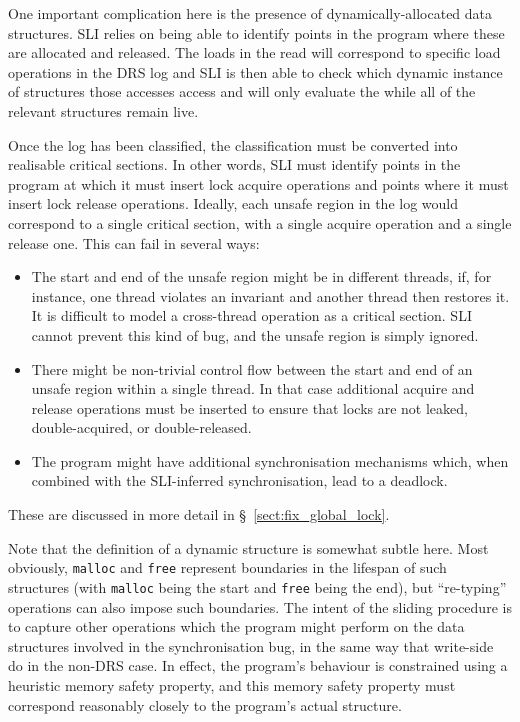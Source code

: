 One important complication here is the presence of dynamically-allocated data structures.
SLI relies on being able to identify points in the program where these are allocated and released.
The loads in the read \StateMachine will correspond to specific load operations in the DRS log and SLI is then able to check which dynamic instance of structures those accesses access and will only evaluate the \StateMachine while all of the relevant structures remain live.

Once the log has been classified, the classification must be converted into realisable critical sections.
In other words, SLI must identify points in the program at which it must insert lock acquire operations and points where it must insert lock release operations.
Ideally, each unsafe region in the log would correspond to a single critical section, with a single acquire operation and a single release one.
This can fail in several ways:

\begin{itemize}
\item
  The start and end of the unsafe region might be in different threads, if, for instance, one thread violates an invariant and another thread then restores it.
  It is difficult to model a cross-thread operation as a critical section.
  SLI cannot prevent this kind of bug, and the unsafe region is simply ignored.
\item
  There might be non-trivial control flow between the start and end of an unsafe region within a single thread.
  In that case additional acquire and release operations must be inserted to ensure that locks are not leaked, double-acquired, or double-released.
\item
  The program might have additional synchronisation mechanisms which, when combined with the SLI-inferred synchronisation, lead to a deadlock.
\end{itemize}

These are discussed in more detail in \S~\ref{sect:fix_global_lock}.


Note that the definition of a dynamic structure is somewhat subtle here.
Most obviously, \verb|malloc| and \verb|free| represent boundaries in the lifespan of such structures (with \verb|malloc| being the start and \verb|free| being the end), but ``re-typing'' operations can also impose such boundaries.
The intent of the sliding procedure is to capture other operations which the program might perform on the data structures involved in the synchronisation bug, in the same way that write-side \StateMachines do in the non-DRS case.
In effect, the program's behaviour is constrained using a heuristic memory safety property, and this memory safety property must correspond reasonably closely to the program's actual structure.

